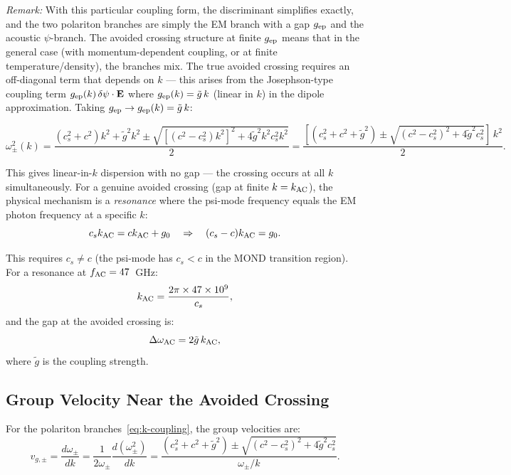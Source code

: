\documentclass[aps,prd,twocolumn,superscriptaddress]{revtex4-2}
\begin{document}
\textit{Remark:} With this particular coupling form, the discriminant
simplifies exactly, and the two polariton branches are simply the
EM branch with a gap $g_{\rm ep}$ and the acoustic $\psi$-branch.
The avoided crossing structure at finite $g_{\rm ep}$ means that in the
general case (with momentum-dependent coupling, or at finite
temperature/density), the branches mix.  The true avoided crossing
requires an off-diagonal term that depends on $k$ --- this arises from
the Josephson-type coupling term $g_{\rm ep}(k)\,\delta\psi\cdot\mathbf{E}$
where $g_{\rm ep}(k) = \tilde{g}\,k$ (linear in $k$) in the dipole
approximation.  Taking $g_{\rm ep} \to g_{\rm ep}(k) = \tilde{g}\,k$:

\begin{equation}
\omega_{\pm}^2(k) = \frac{(c_s^2+c^2)k^2+\tilde{g}^2 k^2
\pm \sqrt{[(c^2-c_s^2)k^2]^2+4\tilde{g}^2 k^2 c_s^2 k^2}}{2}
= \frac{[(c_s^2+c^2+\tilde{g}^2) \pm \sqrt{(c^2-c_s^2)^2+4\tilde{g}^2 c_s^2}]\,k^2}{2}.
\label{eq:k-coupling}
\end{equation}

This gives linear-in-$k$ dispersion with no gap --- the crossing
occurs at all $k$ simultaneously. For a genuine avoided crossing
(gap at finite $k = k_{\rm AC}$), the physical mechanism is a
\emph{resonance} where the psi-mode frequency equals the EM photon
frequency at a specific $k$:
\begin{equation}
c_s k_{\rm AC} = c k_{\rm AC} + g_0 \quad\Rightarrow\quad
(c_s - c) k_{\rm AC} = g_0.
\end{equation}

This requires $c_s \neq c$ (the psi-mode has $c_s < c$ in the MOND
transition region).  For a resonance at $f_{\rm AC} = 47$~GHz:
\begin{equation}
k_{\rm AC} = \frac{2\pi \times 47\times10^9}{c_s},
\end{equation}
and the gap at the avoided crossing is:
\begin{equation}
\Delta\omega_{\rm AC} = 2\tilde{g}\,k_{\rm AC},
\end{equation}
where $\tilde{g}$ is the coupling strength.

\subsection{Group Velocity Near the Avoided Crossing}

For the polariton branches~\eqref{eq:k-coupling}, the group velocities are:
\begin{equation}
v_{g,\pm} = \frac{d\omega_\pm}{dk}
= \frac{1}{2\omega_\pm}\frac{d(\omega_\pm^2)}{dk}
= \frac{(c_s^2+c^2+\tilde{g}^2) \pm \sqrt{(c^2-c_s^2)^2+4\tilde{g}^2 c_s^2}}{\omega_\pm/k}.
\end{equation}
\end{document}
